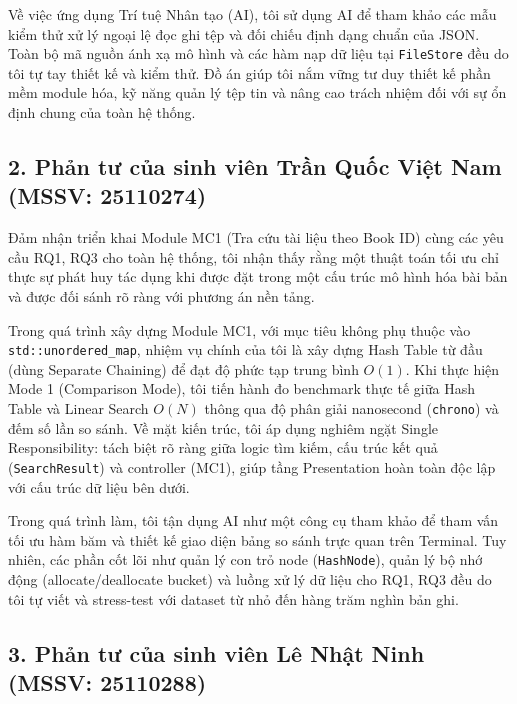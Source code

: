 \documentclass[14pt,a4paper]{extarticle}
\begin{document}
Về việc ứng dụng Trí tuệ Nhân tạo (AI), tôi sử dụng AI để tham khảo các mẫu kiểm thử xử lý ngoại lệ đọc ghi tệp và đối chiếu định dạng chuẩn của JSON. Toàn bộ mã nguồn ánh xạ mô hình và các hàm nạp dữ liệu tại \texttt{FileStore} đều do tôi tự tay thiết kế và kiểm thử. Đồ án giúp tôi nắm vững tư duy thiết kế phần mềm module hóa, kỹ năng quản lý tệp tin và nâng cao trách nhiệm đối với sự ổn định chung của toàn hệ thống.

\subsection*{2. Phản tư của sinh viên Trần Quốc Việt Nam (MSSV: 25110274)}

Đảm nhận triển khai Module MC1 (Tra cứu tài liệu theo Book ID) cùng các yêu cầu RQ1, RQ3 cho toàn hệ thống, tôi nhận thấy rằng một thuật toán tối ưu chỉ thực sự phát huy tác dụng khi được đặt trong một cấu trúc mô hình hóa bài bản và được đối sánh rõ ràng với phương án nền tảng.

Trong quá trình xây dựng Module MC1, với mục tiêu không phụ thuộc vào \texttt{std::unordered\_map}, nhiệm vụ chính của tôi là xây dựng Hash Table từ đầu (dùng Separate Chaining) để đạt độ phức tạp trung bình $O(1)$. Khi thực hiện Mode 1 (Comparison Mode), tôi tiến hành đo benchmark thực tế giữa Hash Table và Linear Search $O(N)$ thông qua độ phân giải nanosecond (\texttt{chrono}) và đếm số lần so sánh. Về mặt kiến trúc, tôi áp dụng nghiêm ngặt Single Responsibility: tách biệt rõ ràng giữa logic tìm kiếm, cấu trúc kết quả (\texttt{SearchResult}) và controller (MC1), giúp tầng Presentation hoàn toàn độc lập với cấu trúc dữ liệu bên dưới.

Trong quá trình làm, tôi tận dụng AI như một công cụ tham khảo để tham vấn tối ưu hàm băm và thiết kế giao diện bảng so sánh trực quan trên Terminal. Tuy nhiên, các phần cốt lõi như quản lý con trỏ node (\texttt{HashNode}), quản lý bộ nhớ động (allocate/deallocate bucket) và luồng xử lý dữ liệu cho RQ1, RQ3 đều do tôi tự viết và stress-test với dataset từ nhỏ đến hàng trăm nghìn bản ghi.

\subsection*{3. Phản tư của sinh viên Lê Nhật Ninh (MSSV: 25110288)}
\end{document}
